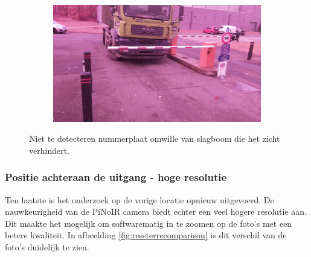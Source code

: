 \begin{figure}[h!]
	\centering
	\begin{subfigure}[b]{0.99\linewidth}
		\includegraphics[width=\linewidth]{img/sterachter/sterachter3.jpg}
	\end{subfigure}
	\caption{Niet te detecteren nummerplaat omwille van slagboom die het zicht verhindert.}
	\label{fig:slagboomster}
\end{figure}

\subsubsection{Positie achteraan de uitgang - hoge resolutie}
Ten laatste is het onderzoek op de vorige locatie opnieuw uitgevoerd. De nauwkeurigheid van de PiNoIR camera biedt echter een veel hogere resolutie aan. Dit maakte het mogelijk om softwarematig in te zoomen op de foto's met een betere kwaliteit. In afbeelding \ref{fig:ressterrecomparison} is dit verschil van de foto's duidelijk te zien.

